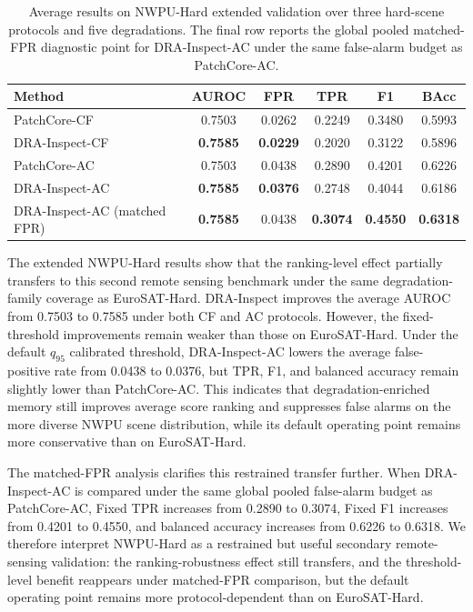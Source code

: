 \documentclass[remotesensing,article,submit,pdftex,moreauthors]{Definitions/mdpi}
\begin{document}
\begin{table}[!htbp]
\caption{Average results on NWPU-Hard extended validation over three hard-scene protocols and five degradations. The final row reports the global pooled matched-FPR diagnostic point for DRA-Inspect-AC under the same false-alarm budget as PatchCore-AC.}
\label{tab:nwpu-hard-main}
\centering
\small
\setlength{\tabcolsep}{4pt}
\begin{tabular}{lccccc}
\hline
Method & AUROC & FPR & TPR & F1 & BAcc \\
\hline
PatchCore-CF & 0.7503 & 0.0262 & 0.2249 & 0.3480 & 0.5993 \\
DRA-Inspect-CF & \textbf{0.7585} & \textbf{0.0229} & 0.2020 & 0.3122 & 0.5896 \\
PatchCore-AC & 0.7503 & 0.0438 & 0.2890 & 0.4201 & 0.6226 \\
DRA-Inspect-AC & \textbf{0.7585} & \textbf{0.0376} & 0.2748 & 0.4044 & 0.6186 \\
DRA-Inspect-AC (matched FPR) & \textbf{0.7585} & 0.0438 & \textbf{0.3074} & \textbf{0.4550} & \textbf{0.6318} \\
\hline
\end{tabular}
\end{table}

\noindent The extended NWPU-Hard results show that the ranking-level effect partially transfers to this second remote sensing benchmark under the same degradation-family coverage as EuroSAT-Hard. DRA-Inspect improves the average AUROC from 0.7503 to 0.7585 under both CF and AC protocols. However, the fixed-threshold improvements remain weaker than those on EuroSAT-Hard. Under the default $q_{95}$ calibrated threshold, DRA-Inspect-AC lowers the average false-positive rate from 0.0438 to 0.0376, but TPR, F1, and balanced accuracy remain slightly lower than PatchCore-AC. This indicates that degradation-enriched memory still improves average score ranking and suppresses false alarms on the more diverse NWPU scene distribution, while its default operating point remains more conservative than on EuroSAT-Hard.

\noindent The matched-FPR analysis clarifies this restrained transfer further. When DRA-Inspect-AC is compared under the same global pooled false-alarm budget as PatchCore-AC, Fixed TPR increases from 0.2890 to 0.3074, Fixed F1 increases from 0.4201 to 0.4550, and balanced accuracy increases from 0.6226 to 0.6318. We therefore interpret NWPU-Hard as a restrained but useful secondary remote-sensing validation: the ranking-robustness effect still transfers, and the threshold-level benefit reappears under matched-FPR comparison, but the default operating point remains more protocol-dependent than on EuroSAT-Hard.
\end{document}
